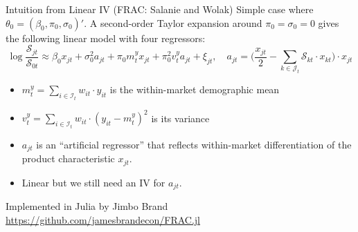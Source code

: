 \begin{frame}{Intuition from Linear IV (FRAC: Salanie and Wolak)}
Simple case where $\theta_0 = (\beta_0, \pi_0, \sigma_0)'$. A second-order Taylor expansion around $\pi_0 = \sigma_0 = 0$ gives the following linear model with four regressors:
\begin{equation}
    \label{eq:frac}
    \log\frac{\mathcal{S}_{jt}}{\mathcal{S}_{0t}} \approx \beta_0 x_{jt} + \sigma_0^2 a_{jt} + \pi_0 m_t^y x_{jt} + \pi_0^2 v_t^y a_{jt} + \xi_{jt}, \quad a_{jt} = \Big(\frac{x_{jt}}{2} - \sum_{k \in \mathcal{J}_t} \mathcal{S}_{kt} \cdot x_{kt}\Big) \cdot x_{jt}
\end{equation}
\begin{itemize}
    \item $m_t^y = \sum_{i \in \mathcal{I}_t} w_{it} \cdot y_{it}$ is the within-market demographic mean
    \item $v_t^y = \sum_{i \in \mathcal{I}_t} w_{it} \cdot (y_{it} - m_t^y)^2$ is its variance
    \item $a_{jt}$ is an ``artificial regressor'' that reflects within-market differentiation of the product characteristic $x_{jt}$.\\
    \item Linear but we still need an IV for $a_{jt}$.
\end{itemize}
Implemented in Julia by Jimbo Brand  \url{https://github.com/jamesbrandecon/FRAC.jl}
\end{frame}


